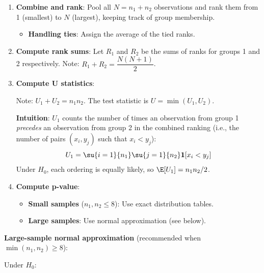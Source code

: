 \begin{enumerate}
    \item \textbf{Combine and rank}: Pool all $N = n_1 + n_2$ observations and rank them
        from 1 (smallest) to $N$ (largest), keeping track of group membership.
        \begin{itemize}
            \item \textbf{Handling ties}: Assign the average of the tied ranks.
        \end{itemize}

    \item \textbf{Compute rank sums}: Let $R_1$ and $R_2$ be the sums of ranks for groups
        1 and 2 respectively. Note: $R_1 + R_2 = \dfrac{N(N+1)}{2}$.

    \item \textbf{Compute U statistics}:
        \begin{center}
        \end{center}

        Note: $U_1 + U_2 = n_1 n_2$. The test statistic is $U = \min(U_1, U_2)$.

        \textbf{Intuition}: $U_1$ counts the number of times an observation from group 1
        \emph{precedes} an observation from group 2 in the combined ranking (i.e., the
        number of pairs $(x_i, y_j)$ such that $x_i < y_j$):
        $$U_1 = \su{i=1}{n_1}\su{j=1}{n_2}\mathbf{1}[x_i < y_j]$$
        Under $H_0$, each ordering is equally likely, so $\E[U_1] = n_1 n_2 / 2$.

    \item \textbf{Compute p-value}:
        \begin{itemize}
            \item \textbf{Small samples} ($n_1, n_2 \leq 8$): Use exact distribution tables.
            \item \textbf{Large samples}: Use normal approximation (see below).
        \end{itemize}
\end{enumerate}

\textbf{Large-sample normal approximation} (recommended when $\min(n_1, n_2) \geq 8$):

Under $H_0$:
\begin{center}
\end{center}

